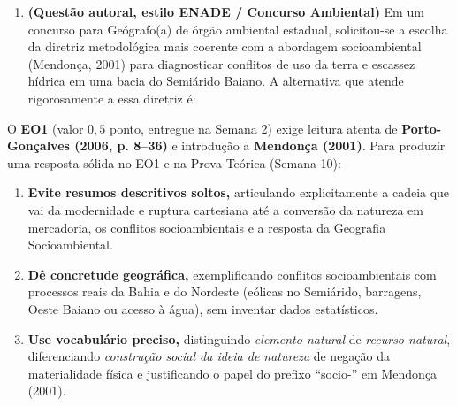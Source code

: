 \begin{enumerate}[leftmargin=1.8em, itemsep=5pt, start=16]
  \item \textbf{(Questão autoral, estilo ENADE / Concurso Ambiental)} Em um concurso para Geógrafo(a) de órgão ambiental estadual, solicitou-se a escolha da diretriz metodológica mais coerente com a abordagem socioambiental (Mendonça, 2001) para diagnosticar conflitos de uso da terra e escassez hídrica em uma bacia do Semiárido Baiano. A alternativa que atende rigorosamente a essa diretriz é:
  \espacoResolucao[1.8cm]
\end{enumerate}

\begin{boxDica}
O \textbf{EO1} (valor $0{,}5$ ponto, entregue na Semana 2) exige leitura atenta de \textbf{Porto-Gonçalves (2006, p. 8--36)} e introdução a \textbf{Mendonça (2001)}. Para produzir uma resposta sólida no EO1 e na Prova Teórica (Semana 10):
\begin{enumerate}[leftmargin=1.5em, itemsep=2pt]
  \item \textbf{Evite resumos descritivos soltos,} articulando explicitamente a cadeia que vai da modernidade e ruptura cartesiana até a conversão da natureza em mercadoria, os conflitos socioambientais e a resposta da Geografia Socioambiental.
  \item \textbf{Dê concretude geográfica,} exemplificando conflitos socioambientais com processos reais da Bahia e do Nordeste (eólicas no Semiárido, barragens, Oeste Baiano ou acesso à água), sem inventar dados estatísticos.
  \item \textbf{Use vocabulário preciso,} distinguindo \emph{elemento natural} de \emph{recurso natural}, diferenciando \emph{construção social da ideia de natureza} de negação da materialidade física e justificando o papel do prefixo ``socio-'' em Mendonça (2001).
\end{enumerate}
\end{boxDica}

